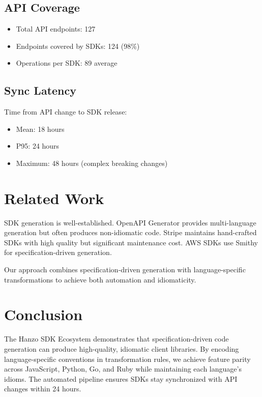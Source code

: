 \documentclass[11pt,a4paper]{article}
\begin{document}
\subsection{API Coverage}

\begin{itemize}
    \item Total API endpoints: 127
    \item Endpoints covered by SDKs: 124 (98\%)
    \item Operations per SDK: 89 average
\end{itemize}

\subsection{Sync Latency}

Time from API change to SDK release:

\begin{itemize}
    \item Mean: 18 hours
    \item P95: 24 hours
    \item Maximum: 48 hours (complex breaking changes)
\end{itemize}

\section{Related Work}

SDK generation is well-established. OpenAPI Generator \cite{openapi2019} provides multi-language generation but often produces non-idiomatic code. Stripe \cite{stripe2019sdk} maintains hand-crafted SDKs with high quality but significant maintenance cost. AWS SDKs \cite{aws2019sdk} use Smithy for specification-driven generation.

Our approach combines specification-driven generation with language-specific transformations to achieve both automation and idiomaticity.

\section{Conclusion}

The Hanzo SDK Ecosystem demonstrates that specification-driven code generation can produce high-quality, idiomatic client libraries. By encoding language-specific conventions in transformation rules, we achieve feature parity across JavaScript, Python, Go, and Ruby while maintaining each language's idioms. The automated pipeline ensures SDKs stay synchronized with API changes within 24 hours.
\end{document}
